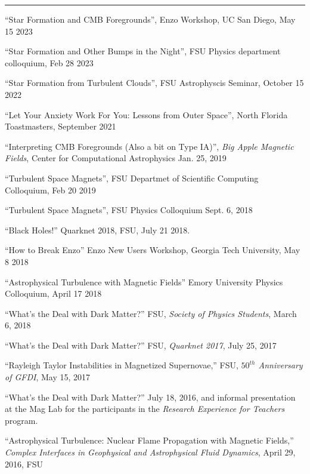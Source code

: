 
\medskip
{}\rule[3pt]{363pt}{.1mm}

\medskip
\noindent
``Star Formation and CMB Foregrounds'', Enzo Workshop, UC San Diego, May 15 2023

\medskip
\noindent
``Star Formation and Other Bumps in the Night'', FSU Physics department
colloquium, Feb 28 2023

\medskip
\noindent
``Star Formation from Turbulent Clouds'', FSU Astrophyscis Seminar, October 15
2022

\medskip
\noindent
``Let Your Anxiety Work For You: Lessons from Outer Space'', North Florida
Toastmasters, September 2021

\medskip
\noindent
``Interpreting CMB Foregrounds (Also a bit on Type IA)'', \emph{Big Apple
Magnetic Fields}, Center for Computational Astrophysics
Jan. 25, 2019

\medskip
\noindent
``Turbulent Space Magnets'', FSU Departmet of Scientific Computing Colloquium,
Feb 20 2019

\medskip
\noindent
``Turbulent Space Magnets'', FSU Physics Colloquium
Sept. 6, 2018

\medskip
\noindent
``Black Holes!'' Quarknet 2018, FSU, July 21 2018.

\medskip
\noindent

``How to Break Enzo'' Enzo New Users Workshop, Georgia Tech University, May 8
2018

\medskip
\noindent

``Astrophysical Turbulence with Magnetic Fields'' Emory University Physics
Colloquium, April 17 2018

\medskip
\noindent
``What’s the Deal with Dark Matter?'' FSU, {\it Society of Physics Students},
March 6, 2018

\medskip
\noindent
``What’s the Deal with Dark Matter?'' FSU, {\it Quarknet 2017}, July 25, 2017

\medskip
\noindent
``Rayleigh Taylor Instabilities in Magnetized Supernovae,'' FSU, {\it $50^{th}$
Anniversary of GFDI}, May 15, 2017

\medskip
\noindent
``What’s the Deal with Dark Matter?'' July 18, 2016, and informal presentation
 at the Mag Lab for the participants in the \emph{Research Experience for
Teachers} program.

\medskip
\noindent
``Astrophysical Turbulence: Nuclear Flame Propagation with Magnetic Fields,''
{\it Complex Interfaces in Geophysical and Astrophysical Fluid Dynamics}, April 29,
2016, FSU


